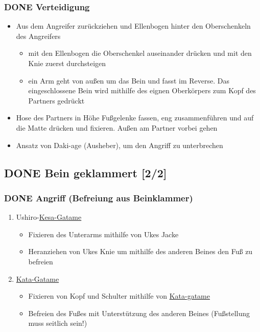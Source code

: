 \documentclass[11pt]{article}
\begin{document}
\subsubsection{{\bfseries\sffamily DONE} Verteidigung}
\label{sec:org69ae0aa}
\begin{itemize}
\item Aus dem Angreifer zurückziehen und Ellenbogen hinter den Oberschenkeln des Angreifers
\begin{itemize}
\item mit den Ellenbogen die Oberschenkel auseinander drücken und mit den Knie zuerst durchsteigen
\item ein Arm geht von außen um das Bein und fasst im Reverse. Das eingeschlossene Bein wird mithilfe des eignen Oberkörpers zum Kopf des Partners gedrückt
\end{itemize}
\item Hose des Partners in Höhe Fußgelenke fassen, eng zusammenführen und auf die Matte drücken und fixieren. Außen am Partner vorbei gehen
\item Ansatz von Daki-age (Ausheber), um den Angriff zu unterbrechen
\end{itemize}


\subsection{{\bfseries\sffamily DONE} \label{org281c89d}Bein geklammert [2/2]}
\label{sec:orge05dba1}
\subsubsection{{\bfseries\sffamily DONE} Angriff (Befreiung aus Beinklammer)}
\label{sec:orgcfd3d7f}
\begin{enumerate}
\item Ushiro-\hyperref[org0fccb72]{Kesa-Gatame}
\begin{itemize}
\item Fixieren des Unterarms mithilfe von Ukes Jacke
\item Heranziehen von Ukes Knie um mithilfe des anderen Beines den Fuß zu befreien
\end{itemize}
\item \hyperref[org9c0034c]{Kata-Gatame}
\begin{itemize}
\item Fixieren von Kopf und Schulter mithilfe von \hyperref[org9c0034c]{Kata-gatame}
\item Befreien des Fußes mit Unterstützung des anderen Beines (Fußstellung muss seitlich sein!)
\end{itemize}
\end{enumerate}
\end{document}
